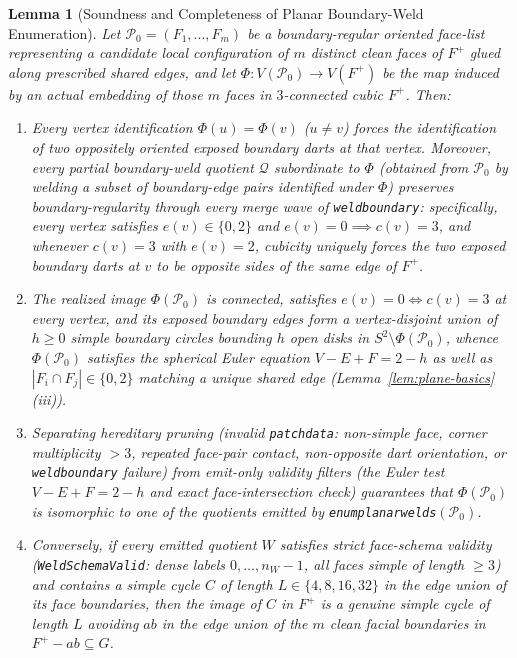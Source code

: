 \documentclass[11pt,reqno]{amsart}
\theoremstyle{plain}
\newtheorem{lemma}[theorem]{Lemma}
\theoremstyle{definition}
\theoremstyle{remark}
\DeclareRobustCommand{\_}{\ifmmode\text{\textunderscore}\else\textunderscore\allowbreak\fi}
\begin{document}
\begin{lemma}[Soundness and Completeness of Planar Boundary-Weld Enumeration]\label{lem:weld-sound}
Let $\mathcal{P}_0 = (F_1, \dots, F_m)$ be a boundary-regular oriented face-list representing a candidate local configuration of $m$ distinct clean faces of $F^+$ glued along prescribed shared edges, and let $\Phi : V(\mathcal{P}_0) \to V(F^+)$ be the map induced by an actual embedding of those $m$ faces in $3$-connected cubic $F^+$. Then:
\begin{enumerate}[label=(\roman*),leftmargin=2.2em]
  \item Every vertex identification $\Phi(u) = \Phi(v)$ ($u \neq v$) forces the identification of two oppositely oriented exposed boundary darts at that vertex. Moreover, every partial boundary-weld quotient $\mathcal{Q}$ subordinate to $\Phi$ (obtained from $\mathcal{P}_0$ by welding a subset of boundary-edge pairs identified under $\Phi$) preserves boundary-regularity through every merge wave of \texttt{weld\_boundary}: specifically, every vertex satisfies $e(v) \in \{0, 2\}$ and $e(v) = 0 \implies c(v) = 3$, and whenever $c(v) = 3$ with $e(v) = 2$, cubicity uniquely forces the two exposed boundary darts at $v$ to be opposite sides of the same edge of $F^+$.
  \item The realized image $\Phi(\mathcal{P}_0)$ is connected, satisfies $e(v) = 0 \iff c(v) = 3$ at every vertex, and its exposed boundary edges form a vertex-disjoint union of $h \ge 0$ simple boundary circles bounding $h$ open disks in $S^2 \setminus \Phi(\mathcal{P}_0)$, whence $\Phi(\mathcal{P}_0)$ satisfies the spherical Euler equation $V - E + F = 2 - h$ as well as $|F_i \cap F_j| \in \{0, 2\}$ matching a unique shared edge (Lemma~\ref{lem:plane-basics}(iii)).
  \item Separating \emph{hereditary pruning} (invalid \texttt{patch\_data}: non-simple face, corner multiplicity $> 3$, repeated face-pair contact, non-opposite dart orientation, or \texttt{weld\_boundary} failure) from \emph{emit-only validity filters} (the Euler test $V - E + F = 2 - h$ and exact face-intersection check) guarantees that $\Phi(\mathcal{P}_0)$ is isomorphic to one of the quotients emitted by \texttt{enum\_planar\_welds}$(\mathcal{P}_0)$.
  \item Conversely, if every emitted quotient $W$ satisfies strict face-schema validity (\texttt{WeldSchemaValid}: dense labels $0,\dots,n_W-1$, all faces simple of length $\ge 3$) and contains a simple cycle $C$ of length $L \in \{4, 8, 16, 32\}$ in the edge union of its face boundaries, then the image of $C$ in $F^+$ is a genuine simple cycle of length $L$ avoiding $ab$ in the edge union of the $m$ clean facial boundaries in $F^+ - ab \subseteq G$.
\end{enumerate}
\end{lemma}
\end{document}
